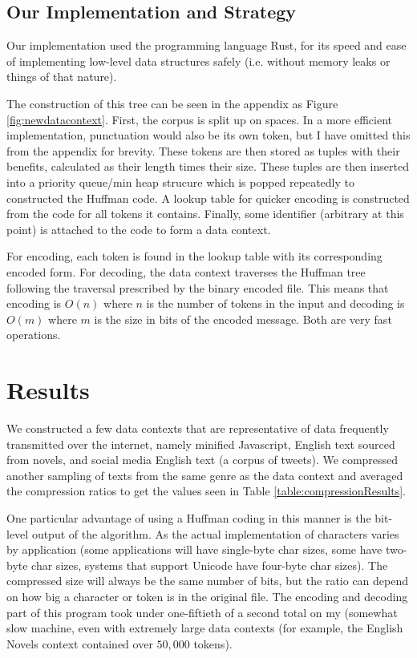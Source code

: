 \subsection{Our Implementation and Strategy}

Our implementation used the programming language Rust, for its speed and ease of implementing low-level data structures safely (i.e. without memory leaks or things of that nature).

The construction of this tree can be seen in the appendix as Figure \ref{fig:newdatacontext}. First, the corpus is split up on spaces. In a more efficient implementation, punctuation would also be its own token, but I have omitted this from the appendix for brevity. These tokens are then stored as tuples with their benefits, calculated as their length times their size. These tuples are then inserted into a priority queue/min heap strucure which is popped repeatedly to constructed the Huffman code. A lookup table for quicker encoding is constructed from the code for all tokens it contains. Finally, some identifier (arbitrary at this point) is attached to the code to form a data context. 

For encoding, each token is found in the lookup table with its corresponding encoded form. For decoding, the data context traverses the Huffman tree following the traversal prescribed by the binary encoded file. This means that encoding is $O(n)$ where $n$ is the number of tokens in the input and decoding is $O(m)$ where $m$ is the size in bits of the encoded message. Both are very fast operations.

\section{Results}
We constructed a few data contexts that are representative of data frequently transmitted over the internet, namely minified Javascript, English text sourced from novels, and social media English text (a corpus of tweets). We compressed another sampling of texts from the same genre as the data context and averaged the compression ratios to get the values seen in Table \ref{table:compressionResults}.



One particular advantage of using a Huffman coding in this manner is the bit-level output of the algorithm. As the actual implementation of characters varies by application (some applications will have single-byte char sizes, some have two-byte char sizes, systems that support Unicode have four-byte char sizes). The compressed size will always be the same number of bits, but the ratio can depend on how big a character or token is in the original file. The encoding and decoding part of this program took under one-fiftieth of a second total on my (somewhat slow machine, even with extremely large data contexts (for example, the English Novels context contained over $50,000$ tokens). 

